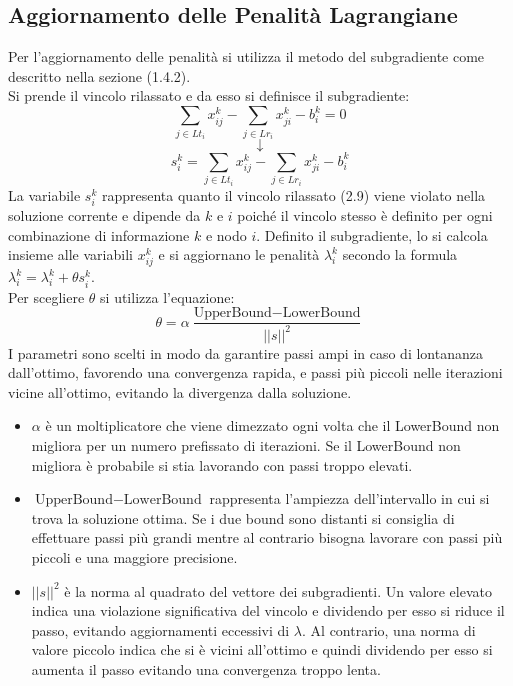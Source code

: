\documentclass[12pt,a4paper,twoside]{report}
\begin{document}
	\subsection{Aggiornamento delle Penalità Lagrangiane}
	Per l'aggiornamento delle penalità si utilizza il metodo del subgradiente come descritto nella sezione (1.4.2). \smallskip \\
	Si prende il vincolo rilassato e da esso si definisce il subgradiente:
	\begin{equation}
		\sum_{j \in Lt_i}x^k_{ij}-\sum_{j \in Lr_i}x^k_{ji}-b^k_i=0
	\end{equation}
	$$\downarrow$$
	\begin{equation}
		s^k_i=\sum_{j \in Lt_i}x^k_{ij}-\sum_{j \in Lr_i}x^k_{ji}-b^k_i
	\end{equation}
	La variabile $s^k_i$ rappresenta quanto il vincolo rilassato (2.9) viene violato nella soluzione corrente e dipende da $k$ e $i$ poiché il vincolo stesso è definito per ogni combinazione di informazione $k$ e nodo $i$.
	Definito il subgradiente, lo si calcola insieme alle variabili $x^k_{ij}$ e si aggiornano le penalità $\lambda^k_i$ secondo la formula $\lambda^k_i=\lambda^k_i+ \theta s^k_i$. \smallskip \\
	Per scegliere $\theta$ si utilizza l'equazione: 
	\begin{equation}
		\theta = \alpha\frac{\text{UpperBound}-\text{LowerBound}}{||s||^2}
	\end{equation}
	I parametri sono scelti in modo da garantire passi ampi in caso di lontananza dall'ottimo, favorendo una convergenza rapida, e passi più piccoli nelle iterazioni vicine all'ottimo, evitando la divergenza dalla soluzione.
	\begin{itemize}
		\item $\alpha$ è un moltiplicatore che viene dimezzato ogni volta che il LowerBound non migliora per un numero prefissato di iterazioni. Se il LowerBound non migliora è probabile si stia lavorando con passi troppo elevati.
		\item $\text{UpperBound}-\text{LowerBound}$ rappresenta l'ampiezza dell'intervallo in cui si trova la soluzione ottima. Se i due bound sono distanti si consiglia di effettuare passi più grandi mentre al contrario bisogna lavorare con passi più piccoli e una maggiore precisione.
		\item $||s||^2$ è la norma al quadrato del vettore dei subgradienti. Un valore elevato indica una violazione significativa del vincolo e dividendo per esso si riduce il passo, evitando aggiornamenti eccessivi di $\lambda$. Al contrario, una norma di valore piccolo indica che si è vicini all'ottimo e quindi dividendo per esso si aumenta il passo evitando una convergenza troppo lenta.
	\end{itemize}
	
\end{document}
